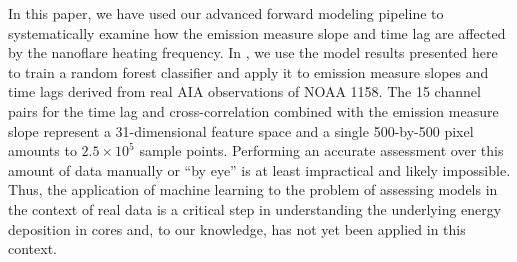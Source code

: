 In this paper, we have used our advanced forward modeling pipeline to systematically examine how the emission measure slope and time lag are affected by the nanoflare heating frequency. In , we use the model results presented here to train a random forest classifier and apply it to emission measure slopes and time lags derived from real AIA observations of NOAA 1158. The 15 channel pairs for the time lag and cross-correlation combined with the emission measure slope represent a 31-dimensional feature space and a single 500-by-500 pixel \AR{} amounts to $2.5\times10^5$ sample points. Performing an accurate assessment over this amount of data manually or ``by eye'' is at least impractical and likely impossible. Thus, the application of machine learning to the problem of assessing models in the context of real data is a critical step in understanding the underlying energy deposition in \AR{} cores and, to our knowledge, has not yet been applied in this context.  
